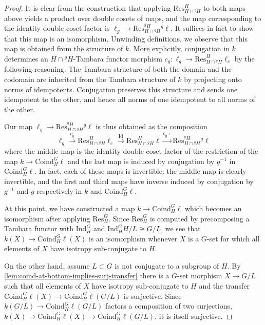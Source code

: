 \documentclass[11pt,dvipsnames]{amsart}
\theoremstyle{BoldRemark}
\begin{document}
\begin{proof}
	It is clear from the construction that applying $\mathrm{Res}_{H \cap {}^g H}^H$ to both maps above yields a product over double cosets of maps, and the map corresponding to the identity double coset factor is $\ell_g \rightarrow \mathrm{Res}_{H \cap {}^g H}^{{}^g H} {}^g \ell$. It suffices in fact to show that this map is an isomorphism. Unwinding definitions, we observe that this map is obtained from the structure of $k$. More explicitly, conjugation in $k$ determines an $H \cap {}^g H$-Tambara functor morphism $c_g : \ell_g \rightarrow \mathrm{Res}_{H \cap {}^g H}^H \ell_e$ by the following reasoning. The Tambara structure of both the domain and the codomain are inherited from the Tambara structure of $k$ by projecting onto norms of idempotents. Conjugation preserves this structure and sends one idempotent to the other, and hence all norms of one idempotent to all norms of the other.
	
	Our map $\ell_g \rightarrow \mathrm{Res}_{H \cap {}^g H}^{{}^g H} {}^g \ell$ is thus obtained as the composition \[ \ell_g \xrightarrow{c_g} \mathrm{Res}_{H \cap {}^g H}^H \ell_e \xrightarrow{\mathrm{Id}} \mathrm{Res}_{H \cap {}^g H}^H \ell \xrightarrow{c_{g^{-1}}} \mathrm{Res}_{H \cap {}^g H}^{{}^g H} {}^g \ell \] where the middle map is the identity double coset factor of the restriction of the map $k \rightarrow \mathrm{Coind}_H^G \ell$ and the last map is induced by conjugation by $g^{-1}$ in $\mathrm{Coind}_H^G \ell$. In fact, each of these maps is invertible: the middle map is clearly invertible, and the first and third maps have inverse induced by conjugation by $g^{-1}$ and $g$ respectively in $k$ and $\mathrm{Coind}_H^G \ell$.

	At this point, we have constructed a map $k \rightarrow \mathrm{Coind}_H^G \ell$ which becomes an isomorphism after applying $\mathrm{Res}_H^G$. Since $\mathrm{Res}_H^G$ is computed by precomposing a Tambara functor with $\mathrm{Ind}_H^G$ and $\mathrm{Ind}_H^G H/L \cong G/L$, we see that $k(X) \rightarrow \mathrm{Coind}_H^G \ell(X)$ is an isomorphism whenever $X$ is a $G$-set for which all elements of $X$ have isotropy sub-conjugate to $H$.
	
	On the other hand, assume $L \subset G$ is not conjugate to a subgroup of $H$. By \cref{lem:coind-at-bottom-implies-surj-transfer} there is a $G$-set morphism $X \rightarrow G/L$ such that all elements of $X$ have isotropy sub-conjugate to $H$ and the transfer $\mathrm{Coind}_H^G \ell(X) \rightarrow \mathrm{Coind}_H^G \ell(G/L)$ is surjective. Since $k(G/L) \rightarrow \mathrm{Coind}_H^G \ell(G/L)$ factors a composition of two surjections, $k(X) \rightarrow \mathrm{Coind}_H^G \ell(X) \rightarrow \mathrm{Coind}_H^G \ell(G/L)$, it is itself surjective.
	

\end{proof}
\end{document}
